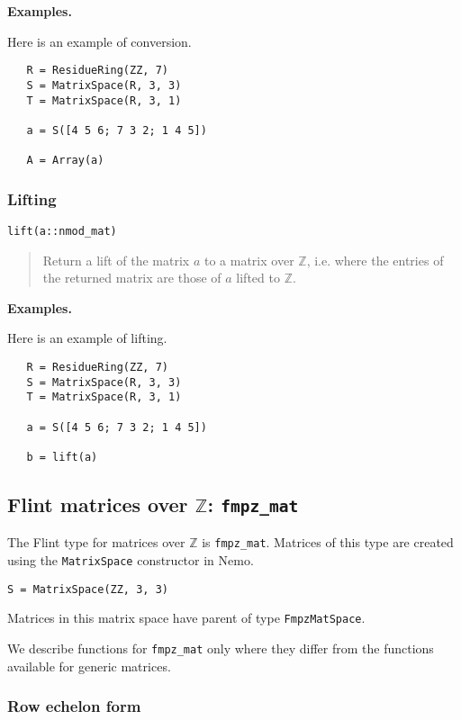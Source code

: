 \documentclass[a4paper,10pt]{article}
\newcommand{\Z}{\mathbb{Z}}
\newcommand{\code}{\lstinline}
\newcommand{\desc}[1]{\vspace{-3mm}\begin{quote}#1\end{quote}}
\begin{document}
{{\textbf{Examples.}

Here is an example of conversion.

\begin{lstlisting}
   R = ResidueRing(ZZ, 7)
   S = MatrixSpace(R, 3, 3)
   T = MatrixSpace(R, 3, 1)

   a = S([4 5 6; 7 3 2; 1 4 5])
  
   A = Array(a)
\end{lstlisting}

\subsubsection{Lifting}

\begin{lstlisting}
lift(a::nmod_mat)
\end{lstlisting}

\desc{Return a lift of the matrix $a$ to a matrix over $\Z$, i.e. where the
entries of the returned matrix are those of $a$ lifted to $\Z$.}

\textbf{Examples.}

Here is an example of lifting.

\begin{lstlisting}
   R = ResidueRing(ZZ, 7)
   S = MatrixSpace(R, 3, 3)
   T = MatrixSpace(R, 3, 1)

   a = S([4 5 6; 7 3 2; 1 4 5])
  
   b = lift(a)
\end{lstlisting}

\subsection{Flint matrices over $\Z$: \code{fmpz_mat}}

The Flint type for matrices over $\Z$ is \code{fmpz_mat}. Matrices
of this type are created using the \code{MatrixSpace} constructor in Nemo. 

\begin{lstlisting}
S = MatrixSpace(ZZ, 3, 3)
\end{lstlisting}

Matrices in this matrix space have parent of type \code{FmpzMatSpace}.

We describe functions for \code{fmpz_mat} only where they differ from the functions
available for generic matrices.

\subsubsection{Row echelon form}

}}
\end{document}
